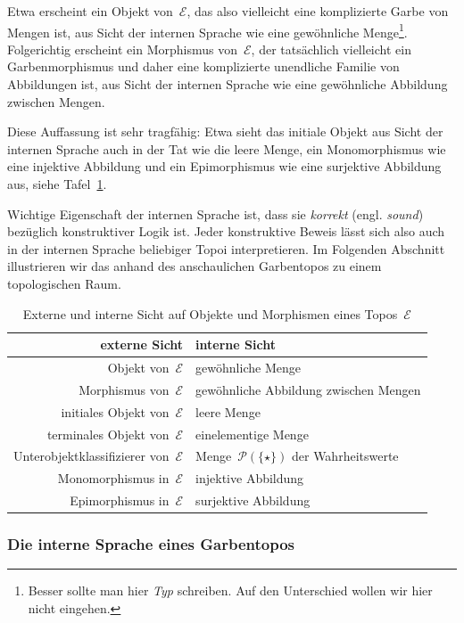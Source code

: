 \documentclass[a4paper,ngerman,12pt]{scrartcl}
\theoremstyle{definition}
\theoremstyle{plain}
\theoremstyle{remark}
\newcommand{\E}{\mathcal{E}}
\renewcommand{\P}{\mathcal{P}}
\renewcommand{\_}{\mathpunct{.}\,}
\newcommand{\?}{\,{:}\,}
\begin{document}
Etwa erscheint ein Objekt von~$\E$, das also vielleicht eine komplizierte Garbe
von Mengen ist, aus Sicht der internen Sprache wie eine gewöhnliche
Menge\footnote{Besser sollte man hier \emph{Typ} schreiben. Auf den
Unterschied wollen wir hier nicht eingehen.}. Folgerichtig erscheint ein
Morphismus von~$\E$, der tatsächlich vielleicht ein Garbenmorphismus und daher
eine komplizierte unendliche
Familie von Abbildungen ist, aus Sicht der internen Sprache wie eine
gewöhnliche Abbildung zwischen Mengen.

Diese Auffassung ist sehr tragfähig: Etwa sieht das initiale Objekt aus Sicht
der internen Sprache auch in der Tat wie die leere Menge, ein Monomorphismus
wie eine injektive Abbildung und ein Epimorphismus wie eine surjektive
Abbildung aus, siehe Tafel~\ref{tafel:externintern}.

Wichtige Eigenschaft der internen Sprache ist, dass sie \emph{korrekt} (engl.
\emph{sound}) bezüglich konstruktiver Logik ist. Jeder konstruktive Beweis
lässt sich also auch in der internen Sprache beliebiger Topoi interpretieren.
Im Folgenden Abschnitt illustrieren wir das anhand des anschaulichen
Garbentopos zu einem topologischen Raum.

\begin{table}
  \centering
  \small
  \setlength{\extrarowheight}{0.3em}
  \begin{tabular}{@{}r|l@{}}
    externe Sicht & interne Sicht
    \\\hline
    Objekt von~$\E$ & gewöhnliche Menge \\
    Morphismus von~$\E$ & gewöhnliche Abbildung zwischen Mengen \\
    initiales Objekt von~$\E$ & leere Menge \\
    terminales Objekt von~$\E$ & einelementige Menge \\
    Unterobjektklassifizierer von~$\E$ & Menge~$\P(\{\star\})$ der
    Wahrheitswerte \\
    Monomorphismus in~$\E$ & injektive Abbildung \\
    Epimorphismus in~$\E$ & surjektive Abbildung
  \end{tabular}
  \caption{\label{tafel:externintern}Externe und interne Sicht auf Objekte und
  Morphismen eines Topos~$\E$}
\end{table}


\subsubsection*{Die interne Sprache eines Garbentopos}
\end{document}
